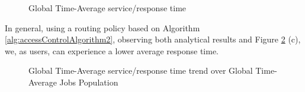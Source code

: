 \documentclass[10pt,a4paper]{article}
\begin{document}
\begin{figure}[h!]
    \centering
    \caption{Global Time-Average service/response time}%
    \label{fig:Class1Class2ServiceTimeComparasion}
\end{figure}

In general, using a routing policy based on Algorithm \ref{alg:accessControlAlgorithm2}, observing both analytical results and Figure \ref{fig:Class1Class2ServiceTimeComparasion} (c), we, as users, can experience a lower average response time.


\begin{figure}[h!]
    \centering
    \caption{Global Time-Average service/response time trend over Global Time-Average Jobs Population}%
    \label{fig:Class1Class2ServiceTimeComparasion}
\end{figure}
\end{document}
